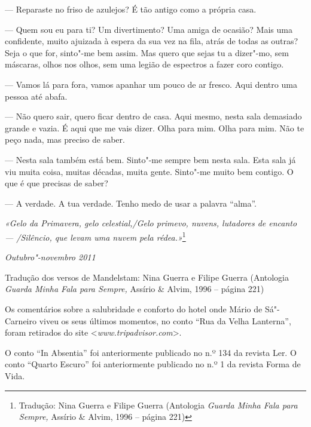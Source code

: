 --- Reparaste no friso de azulejos? É tão antigo como a própria casa.

--- Quem sou eu para ti? Um divertimento? Uma amiga de ocasião? Mais uma
  confidente, muito ajuizada à espera da sua vez na fila, atrás de todas
  as outras? Seja o que for, sinto"-me bem assim. Mas quero que sejas tu
  a dizer"-mo, sem máscaras, olhos nos olhos, sem uma legião de espectros
  a fazer coro contigo.

--- Vamos lá para fora, vamos apanhar um pouco de ar
fresco. Aqui dentro uma pessoa até abafa.

--- Não quero sair, quero ficar dentro de casa. Aqui mesmo, nesta sala
  demasiado grande e vazia. É aqui que me vais dizer. Olha para mim.
  Olha para mim. Não te peço nada, mas preciso de saber.

--- Nesta sala também está bem. Sinto"-me sempre bem nesta sala. Esta sala
  já viu muita coisa, muitas décadas, muita gente. Sinto"-me muito bem
  contigo. O que é que precisas de saber?

--- A verdade. A tua verdade. Tenho medo de usar a palavra ``alma''.

\emph{«Gelo da Primavera, gelo celestial,/Gelo primevo, nuvens,
lutadores de encanto --- /Silêncio, que levam uma nuvem pela
rédea.»}\footnote{Tradução: Nina Guerra e Filipe Guerra
(Antologia \emph{Guarda Minha Fala para Sempre, }Assírio \& Alvim, 1996
-- página 221)}

\begin{flushright}
\emph{Outubro"-novembro 2011}
\end{flushright}

Tradução dos versos de Mandelstam: Nina Guerra e Filipe Guerra
(Antologia \emph{Guarda Minha Fala para Sempre, }Assírio \& Alvim, 1996
-- página 221)

Os comentários sobre a salubridade e conforto do hotel onde Mário de
Sá"-Carneiro viveu os seus últimos momentos, no conto ``Rua da Velha
Lanterna'', foram retirados do site \textless{}\emph{www.tripadvisor.com}\textgreater{}.

O conto ``In Absentia'' foi anteriormente publicado no n.º 134 da
revista Ler. O conto ``Quarto Escuro'' foi anteriormente publicado no
n.º 1 da revista Forma de Vida.

